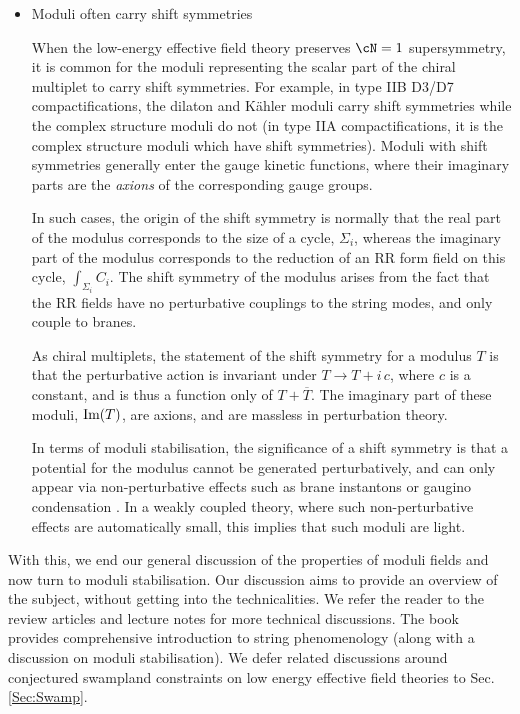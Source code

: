\begin{itemize}
\item{Moduli often carry shift symmetries}

When the low-energy effective field theory preserves $\cN=1$ supersymmetry, it is common for the moduli representing the scalar part of the chiral multiplet to carry shift symmetries. For example, in type IIB D3/D7 compactifications, the dilaton and K\"ahler moduli carry shift symmetries
while the complex structure moduli do not (in type IIA compactifications, it is the complex structure moduli which have shift symmetries). Moduli with shift symmetries generally enter the gauge kinetic functions, where their imaginary parts
are the \emph{axions} of the corresponding gauge groups.

In such cases, the origin of the shift symmetry is normally that  the real part of the modulus corresponds to the size of a cycle, $\Sigma_i$, whereas the imaginary part of the modulus corresponds to the reduction of an RR form field on this cycle, $\int_{\Sigma_i} C_i$. The shift symmetry of the modulus arises from the fact that the RR fields have no perturbative couplings to the string modes, and only couple to branes.

As chiral multiplets, the statement of the shift symmetry for a modulus $T$ is that the perturbative action is invariant under $T \to T + i \,c$,  where $c$ is a constant, and is thus a function only of $T + \overline{T}$. The imaginary part of these moduli, $\hbox{Im}(T)$, are axions, and are massless in perturbation theory.

In terms of moduli stabilisation, the significance of a shift symmetry is that a potential for the modulus cannot be generated perturbatively, and 
can only appear via non-perturbative effects such as brane instantons or gaugino condensation \cite{Dine:1986vd}. In a weakly coupled theory, where such non-perturbative effects are automatically small, this implies that such moduli are light.

\end{itemize}

With this, we end our general discussion of the properties of moduli fields and now turn to moduli stabilisation. Our discussion aims to
provide an overview of the subject, without getting into the technicalities. We refer the reader to the review articles  and lecture notes \cite{ Silverstein:2004id,  Grana:2005jc, Douglas:2006es, Denef:2007pq, Denef:2008wq, Weigand:2018rez, Hebecker:2020aqr} for more technical discussions. The book \cite{Ibanez:2012zz} provides comprehensive introduction to string phenomenology (along with a discussion on moduli stabilisation). We defer related discussions around conjectured swampland constraints on low energy effective field theories to Sec. \ref{Sec:Swamp}.

